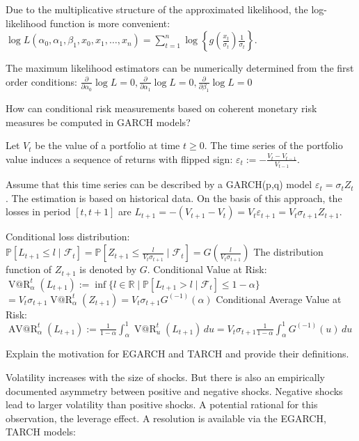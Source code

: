 Due to the multiplicative structure of the approximated likelihood, the log-likelihood function is more convenient:
\(
\log L(\alpha_0, \alpha_1, \beta_1, x_0, x_1, \dots, x_n) = \sum_{t=1}^{n} \log \left\{ g\left( \frac{x_t}{\sigma_t} \right) \frac{1}{\sigma_t} \right\}.
\)

The maximum likelihood estimators can be numerically determined from the first order conditions:
\(
\frac{\partial}{\partial \alpha_0} \log L = 0,\frac{\partial}{\partial \alpha_1} \log L = 0,\frac{\partial}{\partial \beta_1} \log L = 0
\)


How can conditional risk measurements based on coherent monetary risk measures
be computed in GARCH models?


Let \( V_t \) be the value of a portfolio at time \( t \geq 0 \).  
The time series of the portfolio value induces a sequence of returns with flipped sign:
\(
\varepsilon_t := -\frac{V_t - V_{t-1}}{V_{t-1}}.
\)

Assume that this time series can be described by a GARCH(p,q) model \( \varepsilon_t = \sigma_t Z_t \). The estimation is based on historical data.  
On the basis of this approach, the losses in period \([t, t+1]\) are
\(
L_{t+1} = -(V_{t+1} - V_t) = V_t \varepsilon_{t+1} = V_t \sigma_{t+1} Z_{t+1}.
\)

Conditional loss distribution:
\(
\mathbb{P}[L_{t+1} \leq l \mid \mathcal{F}_t] = \mathbb{P}[Z_{t+1} \leq \frac{l}{V_t \sigma_{t+1}} \mid \mathcal{F}_t] = G\left( \frac{l}{V_t \sigma_{t+1}} \right)
\)
The distribution function of \( Z_{t+1} \) is denoted by \( G \).
Conditional Value at Risk:
\(
\operatorname{V@R}^{t}_{\alpha} (L_{t+1}) := \inf \{ l \in \mathbb{R} \mid \mathbb{P}[L_{t+1} > l \mid \mathcal{F}_t] \leq 1 - \alpha \}
\)
\(
= V_t \sigma_{t+1} \operatorname{V@R}^{t}_{\alpha} (Z_{t+1}) = V_t \sigma_{t+1} G^{(-1)} (\alpha)
\)
Conditional Average Value at Risk:
\(
\operatorname{AV@R}^{t}_{\alpha} (L_{t+1}) := \frac{1}{1 - \alpha} \int_{\alpha}^{1} \operatorname{V@R}^{t}_{u} (L_{t+1}) \, du = V_t \sigma_{t+1} \frac{1}{1 - \alpha} \int_{\alpha}^{1} G^{(-1)} (u) \, du
\)

Explain the motivation for EGARCH and TARCH and provide their definitions.

Volatility increases with the size of shocks.
But there is also an empirically documented asymmetry between positive and negative shocks. Negative
shocks lead to larger volatility than positive shocks.
A potential rational for this observation, the leverage effect.
A resolution is available via the EGARCH, TARCH models:

